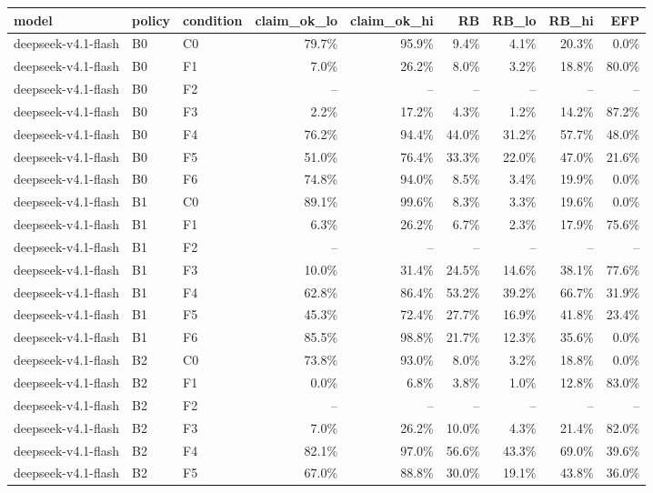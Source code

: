 \begin{tabular}{lllrrrrrr}
\toprule
model & policy & condition & claim\_ok\_lo & claim\_ok\_hi & RB & RB\_lo & RB\_hi & EFP \\
\midrule
deepseek-v4.1-flash & B0 & C0 & 79.7\% & 95.9\% & 9.4\% & 4.1\% & 20.3\% & 0.0\% \\
deepseek-v4.1-flash & B0 & F1 & 7.0\% & 26.2\% & 8.0\% & 3.2\% & 18.8\% & 80.0\% \\
deepseek-v4.1-flash & B0 & F2 & -- & -- & -- & -- & -- & -- \\
deepseek-v4.1-flash & B0 & F3 & 2.2\% & 17.2\% & 4.3\% & 1.2\% & 14.2\% & 87.2\% \\
deepseek-v4.1-flash & B0 & F4 & 76.2\% & 94.4\% & 44.0\% & 31.2\% & 57.7\% & 48.0\% \\
deepseek-v4.1-flash & B0 & F5 & 51.0\% & 76.4\% & 33.3\% & 22.0\% & 47.0\% & 21.6\% \\
deepseek-v4.1-flash & B0 & F6 & 74.8\% & 94.0\% & 8.5\% & 3.4\% & 19.9\% & 0.0\% \\
deepseek-v4.1-flash & B1 & C0 & 89.1\% & 99.6\% & 8.3\% & 3.3\% & 19.6\% & 0.0\% \\
deepseek-v4.1-flash & B1 & F1 & 6.3\% & 26.2\% & 6.7\% & 2.3\% & 17.9\% & 75.6\% \\
deepseek-v4.1-flash & B1 & F2 & -- & -- & -- & -- & -- & -- \\
deepseek-v4.1-flash & B1 & F3 & 10.0\% & 31.4\% & 24.5\% & 14.6\% & 38.1\% & 77.6\% \\
deepseek-v4.1-flash & B1 & F4 & 62.8\% & 86.4\% & 53.2\% & 39.2\% & 66.7\% & 31.9\% \\
deepseek-v4.1-flash & B1 & F5 & 45.3\% & 72.4\% & 27.7\% & 16.9\% & 41.8\% & 23.4\% \\
deepseek-v4.1-flash & B1 & F6 & 85.5\% & 98.8\% & 21.7\% & 12.3\% & 35.6\% & 0.0\% \\
deepseek-v4.1-flash & B2 & C0 & 73.8\% & 93.0\% & 8.0\% & 3.2\% & 18.8\% & 0.0\% \\
deepseek-v4.1-flash & B2 & F1 & 0.0\% & 6.8\% & 3.8\% & 1.0\% & 12.8\% & 83.0\% \\
deepseek-v4.1-flash & B2 & F2 & -- & -- & -- & -- & -- & -- \\
deepseek-v4.1-flash & B2 & F3 & 7.0\% & 26.2\% & 10.0\% & 4.3\% & 21.4\% & 82.0\% \\
deepseek-v4.1-flash & B2 & F4 & 82.1\% & 97.0\% & 56.6\% & 43.3\% & 69.0\% & 39.6\% \\
deepseek-v4.1-flash & B2 & F5 & 67.0\% & 88.8\% & 30.0\% & 19.1\% & 43.8\% & 36.0\% \\

\end{tabular}
